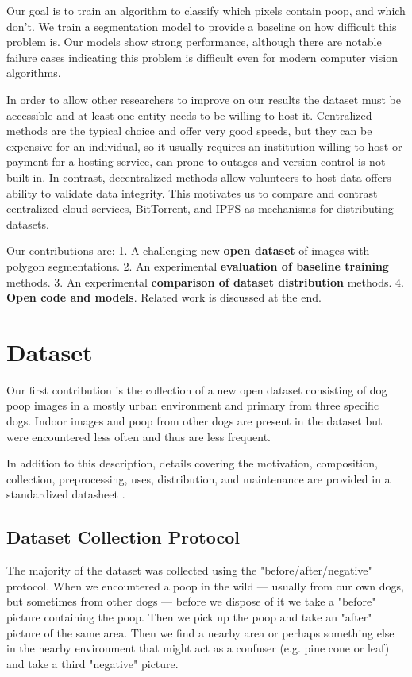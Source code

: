 \documentclass[10pt,twocolumn,letterpaper]{article}
\begin{document}
Our goal is to train an algorithm to classify which pixels contain poop, and
which don't. We train a segmentation model to provide a baseline on how
difficult this problem is. Our models show strong performance, although there
are notable failure cases indicating this problem is difficult even for modern
computer vision algorithms.

In order to allow other researchers to improve on our results the dataset must
be accessible and at least one entity needs to be willing to host it.
Centralized methods are the typical choice and offer very good speeds, 
but they can be expensive for an individual, so it usually requires an
institution willing to host or payment for a hosting service,
can prone to outages and version control is not built in.
In contrast, decentralized methods allow volunteers to host data offers ability
to validate data integrity. 
This motivates us to compare and contrast centralized cloud services,
BitTorrent, and IPFS as mechanisms for distributing datasets.



Our contributions are:
1. A challenging new \textbf{open dataset} of images with polygon segmentations.
2. An experimental \textbf{evaluation of baseline training} methods.
3. An experimental \textbf{comparison of dataset distribution} methods.
4. \textbf{Open code and models}.
Related work is discussed at the end.



\section{Dataset}

Our first contribution is the collection of a new open dataset consisting of
dog poop images in a mostly urban environment and primary from three specific
dogs. Indoor images and poop from other dogs are present in the dataset but
were encountered less often and thus are less frequent.

In addition to this description, details covering the motivation, composition,
collection, preprocessing, uses, distribution, and maintenance are provided in
a standardized datasheet \cite{gebru_datasheets_2021}.

\subsection{Dataset Collection Protocol}
The majority of the dataset was collected using the "before/after/negative"
protocol.
When we encountered a poop in the wild --- usually from our own dogs, but
sometimes from other dogs --- before we dispose of it we 
take a "before" picture containing the poop.
Then we pick up the poop and take an "after" picture of the same area. 
Then we find a nearby area or perhaps something else in the nearby environment
that might act as a confuser (e.g. pine cone or leaf) and take a third
"negative" picture.
\end{document}

